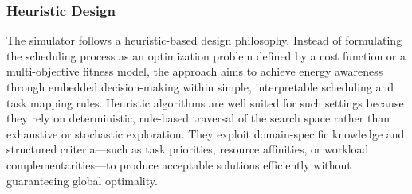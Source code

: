 \subsubsection{Heuristic Design}
\label{sec:heuristic_design}
The simulator follows a heuristic-based design philosophy. Instead of formulating the scheduling process as an optimization problem defined by a cost function or a multi-objective fitness model, the approach aims to achieve energy awareness through embedded decision-making within simple, interpretable scheduling and task mapping rules. Heuristic algorithms are well suited for such settings because they rely on deterministic, rule-based traversal of the search space rather than exhaustive or stochastic exploration. They exploit domain-specific knowledge and structured criteria—such as task priorities, resource affinities, or workload complementarities—to produce acceptable solutions efficiently without guaranteeing global optimality.

